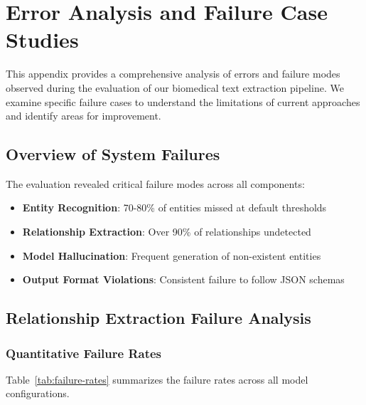 
\chapter{Error Analysis and Failure Case Studies}

\label{AppendixC} %

This appendix provides a comprehensive analysis of errors and failure modes observed during the evaluation of our biomedical text extraction pipeline. We examine specific failure cases to understand the limitations of current approaches and identify areas for improvement.

\section{Overview of System Failures}

The evaluation revealed critical failure modes across all components:
\begin{itemize}
    \item \textbf{Entity Recognition}: 70-80\% of entities missed at default thresholds
    \item \textbf{Relationship Extraction}: Over 90\% of relationships undetected
    \item \textbf{Model Hallucination}: Frequent generation of non-existent entities
    \item \textbf{Output Format Violations}: Consistent failure to follow JSON schemas
\end{itemize}

\section{Relationship Extraction Failure Analysis}

\subsection{Quantitative Failure Rates}

Table~\ref{tab:failure-rates} summarizes the failure rates across all model configurations.


